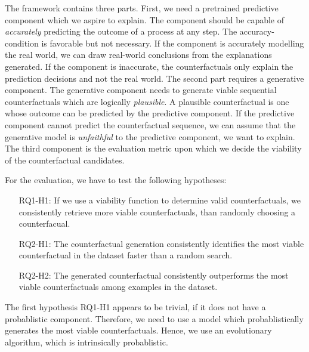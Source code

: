 \documentclass[./../../paper.tex]{subfiles}
\begin{document}
\noindent The framework contains three parts. First, we need a pretrained predictive component which we aspire to explain. The component should be capable of \emph{accurately} predicting the outcome of a process at any step. The accuracy-condition is favorable but not necessary. If the component is accurately modelling the real world, we can draw real-world conclusions from the explanations generated. If the component is inaccurate, the counterfactuals only explain the prediction decisions and not the real world. The second part requires a generative component. The generative component needs to generate viable sequential counterfactuals which are logically \emph{plausible}. A plausible counterfactual is one whose outcome can be  predicted by the predictive component. If the predictive component cannot predict the counterfactual sequence, we can assume that the generative model is \emph{unfaithful} to the predictive component, we want to explain. The third component is the evaluation metric upon which we decide the viability of the counterfactual candidates.

For the evaluation, we have to test the following hypotheses: 
\begin{itemize}
    \item[RQ1-H1:] If we use a viability function to determine valid counterfactuals, we consistently retrieve more viable counterfactuals, than randomly choosing a counterfacual.
    \item[RQ2-H1:] The counterfactual generation consistently identifies the most viable counterfactual in the dataset faster than a random search.
    \item[RQ2-H2:] The generated counterfactual consistently outperforms the most viable counterfactuals among examples in the dataset.  
\end{itemize}

The first hypothesis RQ1-H1 appears to be trivial, if it does not have a probablistic component. Therefore, we need to use a model which probablistically generates the most viable counterfactuals. Hence, we use an evolutionary algorithm, which is intrinsically probablistic. 
\end{document}
